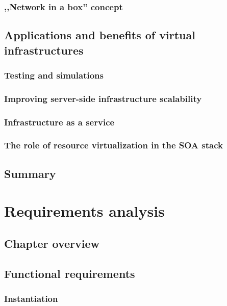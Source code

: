 \documentclass[11pt]{book}
\begin{document}
      \subsection{,,Network in a box'' concept}


    \section{Applications and benefits of virtual infrastructures}

      \subsection{Testing and simulations}

      \subsection{Improving server-side infrastructure scalability}

      \subsection{Infrastructure as a service}

      \subsection{The role of resource virtualization in the SOA stack}


    \section*{Summary}


  \chapter{Requirements analysis}
    
    \section*{Chapter overview}

    \section{Functional requirements}

      \subsection{Instantiation}
\end{document}
